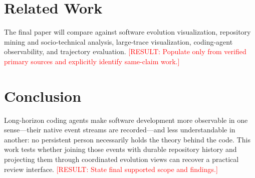\documentclass[10pt,twocolumn]{article}
\newcommand{\result}[1]{\textcolor{red}{[RESULT: #1]}}
\begin{document}
\section{Related Work}
The final paper will compare against software evolution visualization,
repository mining and socio-technical analysis, large-trace visualization,
coding-agent observability, and trajectory evaluation. \result{Populate only
from verified primary sources and explicitly identify same-claim work.}

\section{Conclusion}
Long-horizon coding agents make software development more observable in one
sense---their native event streams are recorded---and less understandable in
another: no persistent person necessarily holds the theory behind the code.
This work tests whether joining those events with durable repository history
and projecting them through coordinated evolution views can recover a
practical review interface. \result{State final supported scope and findings.}
\end{document}
